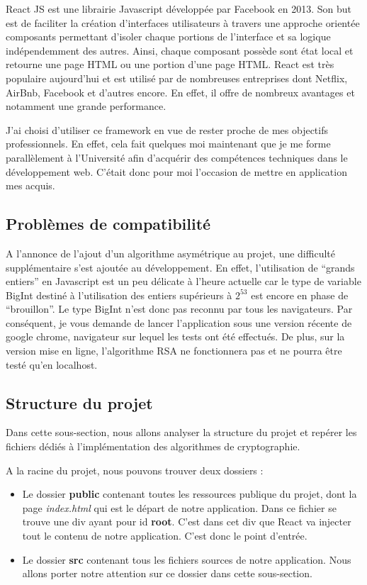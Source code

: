 \documentclass{article}
\begin{document}
React JS est une librairie Javascript développée par Facebook en 2013. Son but est de faciliter la création d'interfaces utilisateurs à travers une approche orientée composants permettant d'isoler chaque portions de l'interface et sa logique indépendemment des autres. Ainsi, chaque composant possède sont état local et retourne une page HTML ou une portion d'une page HTML. React est très populaire aujourd'hui et est utilisé par de nombreuses entreprises dont Netflix, AirBnb, Facebook et d'autres encore. En effet, il offre de nombreux avantages et notamment une grande performance. 

J'ai choisi d'utiliser ce framework en vue de rester proche de mes objectifs professionnels. En effet, cela fait quelques moi maintenant que je me forme parallèlement à l'Université afin d'acquérir des compétences techniques dans le développement web. C'était donc pour moi l'occasion de mettre en application mes acquis.

\cleardoublepage

\subsection{Problèmes de compatibilité}
A l'annonce de l'ajout d'un algorithme asymétrique au projet, une difficulté supplémentaire s'est ajoutée au développement. En effet, l'utilisation de \foreignquote{french}{grands entiers} en Javascript est un peu délicate à l'heure actuelle car le type de variable BigInt destiné à l'utilisation des entiers supérieurs à $2^{53}$ est encore en phase de \foreignquote{french}{brouillon}\cite{bigInt}. Le type BigInt n'est donc pas reconnu par tous les navigateurs. Par conséquent, je vous demande de lancer l'application sous une version récente de google chrome, navigateur sur lequel les tests ont été effectués. De plus, sur la version mise en ligne, l'algorithme RSA ne fonctionnera pas et ne pourra être testé qu'en localhost. 

\subsection{Structure du projet}
Dans cette sous-section, nous allons analyser la structure du projet et repérer les fichiers dédiés à l'implémentation des algorithmes de cryptographie.

A la racine du projet, nous pouvons trouver deux dossiers : 
\begin{itemize}
\item Le dossier \textbf{public} contenant toutes les ressources publique du projet, dont la page\textit{ index.html} qui est le départ de notre application. Dans ce fichier se trouve une div ayant pour id \textbf{root}. C'est dans cet div que React va injecter tout le contenu de notre application. C'est donc le point d'entrée.
\item Le dossier \textbf{src} contenant tous les fichiers sources de notre application. Nous allons porter notre attention sur ce dossier dans cette sous-section.
\end{itemize}
\end{document}
